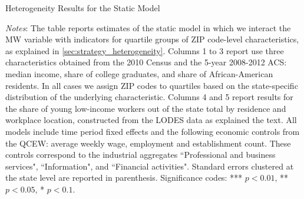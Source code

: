 \begin{table}[h!]
	\caption{Heterogeneity Results for the Static Model}
	\label{tab:fd_model_het}
	\centering
	\resizebox{\textwidth}{!}{
		}
	\begin{minipage}{0.95\textwidth} \footnotesize
		\vspace{3mm}
		\textit{Notes}: The table reports estimates of the static model in which we interact 
		the MW variable with indicators for quartile groups of ZIP code-level characteristics, 
		as explained in \autoref{sec:strategy_heterogeneity}. Columns 1 to 3 report use three 
		characteristics obtained from the 2010 Census and the 5-year 2008-2012 ACS: median 
		income, share of college graduates, and share of African-American residents. In all 
		cases we assign ZIP codes to quartiles based on the state-specific distribution of the 
		underlying characteristic. Columns 4 and 5 report results for the share of young 
		low-income workers out of the state total by residence and workplace location, 
		constructed from the LODES data as explained the text. All models include time period 
		fixed effects and the following economic controls from the QCEW: average
		weekly wage, employment and establishment count. These controls correspond to the 
		industrial aggregates ``Professional and business services", ``Information", and 
		``Financial activities".
		Standard errors clustered at the state level are reported in parenthesis. Significance 
		codes: *** $p < 0.01$, ** $p < 0.05$, * $p < 0.1$.
	\end{minipage}
\end{table}





